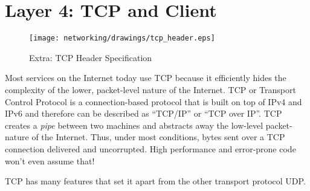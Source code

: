 \section{Layer 4: TCP and Client}

\begin{figure}[H]
  \centering
\texttt{[image: networking/drawings/tcp\_header.eps]}
\caption{Extra: TCP Header Specification}
\end{figure}

Most services on the Internet today use \gls{TCP} because it efficiently hides the complexity of the lower, packet-level nature of the Internet.
TCP or Transport Control Protocol is a connection-based protocol that is built on top of IPv4 and IPv6 and therefore can be described as ``TCP/IP'' or ``TCP over IP''.
TCP creates a \emph{pipe} between two machines and abstracts away the low-level packet-nature of the Internet. Thus, under most conditions, bytes sent over a TCP connection delivered and uncorrupted.
High performance and error-prone code won't even assume that!

TCP has many features that set it apart from the other transport protocol UDP.


